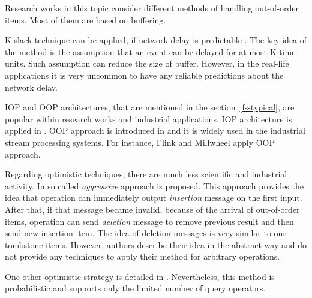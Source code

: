 
\label {fs-related}

Research works in this topic consider different methods of handling out-of-order items. Most of them are based on buffering.

K-slack technique can be applied, if network delay is predictable \cite{Babu:2004:EKC:1016028.1016032, Li:2007:ESP:1270388.1270975}. The key idea of the method is the assumption that an event can be delayed for at most K time units. Such assumption can reduce the size of buffer. However, in the real-life applications it is very uncommon to have any reliable predictions about the network delay.

IOP and OOP architectures, that are mentioned in the section~\ref{fs-typical}, are popular within research works and industrial applications. IOP architecture is applied in \cite{Cranor:2003:GSD:872757.872838, Abadi:2003:ANM:950481.950485, Arasu:2006:CCQ:1146461.1146463, Ding:2004:EWJ:1031171.1031189, Hammad:2003:SSW:1315451.1315478, Hammad:2005:OIE:1116877.1116897}. OOP approach is introduced in \cite{Li:2008:OPN:1453856.1453890} and it is widely used in the industrial stream processing systems. For instance, Flink \cite{carbone2015apache} and Millwheel \cite{Akidau:2013:MFS:2536222.2536229} apply OOP approach.

Regarding optimistic techniques, there are much less scientific and industrial activity. In \cite{Wei:2009:SSO:1559845.1559973} so called {\it aggressive} approach is proposed. This approach provides the idea that operation can immediately output {\it insertion} message on the first input. After that, if that message became invalid, because of the arrival of out-of-order items, operation can send {\it deletion} message to remove previous result and then send new insertion item. The idea of deletion messages is very similar to our tombstone items. However, authors describe their idea in the abstract way and do not provide any techniques to apply their method for arbitrary operations.

One other optimistic strategy is detailed in \cite{Li2011}. Nevertheless, this method is probabilistic and supports only the limited number of query operators.